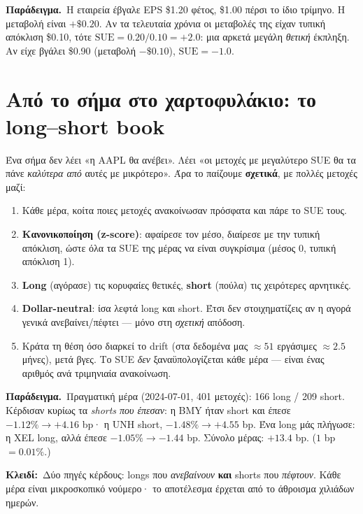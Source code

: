 \documentclass[11pt]{article}
\newcommand{\SUE}{\mathrm{SUE}}\newcommand{\IC}{\mathrm{IC}}\newcommand{\IR}{\mathrm{IR}}\newcommand{\AR}{\mathrm{AR}}
\newcommand{\key}[1]{\par\medskip\noindent\colorbox{soft}{\parbox{\dimexpr\linewidth-2\fboxsep}{\textcolor{accent}{\textbf{Κλειδί:}}\ #1}}\par\medskip}
\newcommand{\ex}[1]{\par\smallskip\noindent\textbf{\textcolor{accent}{Παράδειγμα.}}\ #1\par\smallskip}
\begin{document}
\ex{Η εταιρεία έβγαλε EPS \$1.20 φέτος, \$1.00 πέρσι το ίδιο τρίμηνο. Η μεταβολή είναι $+\$0.20$. Αν
τα τελευταία χρόνια οι μεταβολές της είχαν τυπική απόκλιση \$0.10, τότε $\SUE=0.20/0.10=+2.0$: μια
αρκετά μεγάλη \emph{θετική} έκπληξη. Αν είχε βγάλει \$0.90 (μεταβολή $-\$0.10$), $\SUE=-1.0$.}

\section{Από το σήμα στο χαρτοφυλάκιο: το long--short book}

Ένα σήμα δεν λέει «η AAPL θα ανέβει». Λέει «οι μετοχές με μεγαλύτερο SUE θα τα πάνε \emph{καλύτερα από}
αυτές με μικρότερο». Άρα το παίζουμε \textbf{σχετικά}, με πολλές μετοχές μαζί:

\begin{enumerate}[leftmargin=1.4em]
\item Κάθε μέρα, κοίτα ποιες μετοχές ανακοίνωσαν πρόσφατα και πάρε το SUE τους.
\item \textbf{Κανονικοποίηση (z-score)}: αφαίρεσε τον μέσο, διαίρεσε με την τυπική απόκλιση, ώστε όλα
τα SUE της μέρας να είναι συγκρίσιμα (μέσος 0, τυπική απόκλιση 1).
\item \textbf{Long} (αγόρασε) τις κορυφαίες θετικές, \textbf{short} (πούλα) τις χειρότερες αρνητικές.
\item \textbf{Dollar-neutral}: ίσα λεφτά long και short. Έτσι δεν στοιχηματίζεις αν η αγορά γενικά
ανεβαίνει/πέφτει --- μόνο στη \emph{σχετική} απόδοση.
\item Κράτα τη θέση όσο διαρκεί το drift (στα δεδομένα μας $\approx 51$ εργάσιμες $\approx 2.5$ μήνες),
μετά βγες. Το SUE \emph{δεν} ξαναϋπολογίζεται κάθε μέρα --- είναι ένας αριθμός ανά τριμηνιαία ανακοίνωση.
\end{enumerate}

\ex{Πραγματική μέρα (2024-07-01, 401 μετοχές): 166 long / 209 short. Κέρδισαν κυρίως τα \emph{shorts
που έπεσαν}: η BMY ήταν short και έπεσε $-1.12\%\to+4.16$ bp· η UNH short, $-1.48\%\to+4.55$ bp. Ένα
long μάς πλήγωσε: η XEL long, αλλά έπεσε $-1.05\%\to-1.44$ bp. Σύνολο μέρας: $+13.4$ bp.
($1$ bp $=0.01\%$.)}

\key{Δύο πηγές κέρδους: longs που \emph{ανεβαίνουν} \textbf{και} shorts που \emph{πέφτουν}. Κάθε μέρα
είναι μικροσκοπικό νούμερο· το αποτέλεσμα έρχεται από το άθροισμα χιλιάδων ημερών.}

\end{document}

